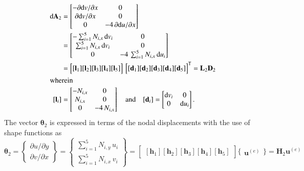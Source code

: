 \begin{subequations}
	\begin{align}
	\mathrm{d} \mathbf{A}_2 & =  \begin{bmatrix}
	- \partial \mathrm{d} v / \partial x &  0 \\
	\partial \mathrm{d} v / \partial x & 0 \\
	0 & -4 \, \partial \mathrm{d} u / \partial x  \end{bmatrix} \notag \\
	& = \begin{bmatrix}
	- \sum\nolimits_{i=1}^5 N_{i,x} \, \mathrm{d} v_i &  0 \\
	\sum\nolimits_{i=1}^5 N_{i,x} \, \mathrm{d} v_i &  0 \\
	0  & - 4 \, \sum\nolimits_{i=1}^5 N_{i,x} \, \mathrm{d} u_i  \end{bmatrix} \notag \\
	& = \begin{bmatrix}
	[\mathbf{l}_1] [\mathbf{l}_2] [\mathbf{l}_3] [\mathbf{l}_4] [\mathbf{l}_5] 
	\end{bmatrix}  \, \begin{bmatrix} [\mathbf{d}_1] [\mathbf{d}_2] [\mathbf{d}_3] [\mathbf{d}_4] [\mathbf{d}_5] \end{bmatrix}^{\mathsf{T}}
	= \mathbf{L}_2 \mathbf{D}_2 \\
	\intertext{wherein}
	[\mathbf{l}_i] & = \begin{bmatrix}
	- N_{i,x} &  0 \\
	N_{i,x} & 0 \\
	0  & - 4 \, N_{i,x} \end{bmatrix}  \quad \text{and} \quad	[\mathbf{d}_i] = \begin{bmatrix}
	\mathrm{d} v_i & 0 \\
	0 &  \mathrm{d} u_i  \end{bmatrix} .
	\end{align}
\end{subequations}
The vector $\boldsymbol{\theta}_2$ is expressed in terms of the nodal displacements with the use of shape functions as
\small
\begin{equation}
\boldsymbol{\theta}_2 =  \begin{Bmatrix}
\partial u / \partial y\\
\partial v / \partial x
\end{Bmatrix}
= \begin{Bmatrix}
\sum\nolimits_{i=1}^5 N_{i,y} \, u_i\\
\sum\nolimits_{i=1}^5 N_{i,x} \, v_i
\end{Bmatrix} 
= \begin{bmatrix}
[\mathbf{h}_1] [\mathbf{h}_2] [\mathbf{h}_3] [\mathbf{h}_4] [\mathbf{h}_5] 
\end{bmatrix} \bigl\{ \begin{matrix} \mathbf{u}^{(e)} \end{matrix} \bigr\}
= \mathbf{H}_2  \mathbf{u}^{(e)}  
\end{equation}

